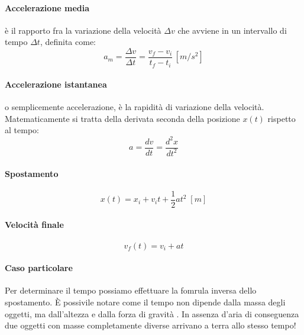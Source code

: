         \paragraph{Accelerazione media} è il rapporto fra la variazione della
        velocità $\Delta v$ che avviene in un intervallo di tempo $\Delta t$, 
        definita come:
        \begin{equation}
            a_m = \frac{\Delta v}{\Delta t} = \frac{v_f - v_i}{t_f - t_i} 
            \, [m/s^2]
        \end{equation}

        \paragraph{Accelerazione istantanea} o semplicemente accelerazione, è 
        la rapidità di variazione della velocità. Matematicamente si tratta 
        della derivata seconda della posizione $x(t)$ rispetto al tempo:
        \begin{equation}
            a = \frac{dv}{dt} = \frac{d^2x}{dt^2}
        \end{equation}

        \paragraph{Spostamento}
            \begin{equation}
                x(t) = x_i + v_it + \frac{1}{2}at^2 \; [m]
            \end{equation}

        \paragraph{Velocità finale}
            \begin{equation}
                v_f(t) = v_{i} + at
            \end{equation}
    
        \paragraph{Caso particolare}
            Per determinare il tempo possiamo effettuare la fomrula inversa 
            dello spostamento. È possivile notare come il tempo non dipende 
            dalla massa degli oggetti, ma dall'altezza e dalla forza di gravità
            . In assenza d'aria di conseguenza due oggetti con masse 
            completamente diverse arrivano a terra allo stesso tempo!

